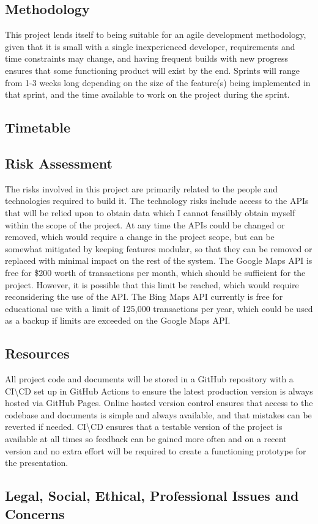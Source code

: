 \subsection{Methodology}
This project lends itself to being suitable for an agile development methodology, given that it is small with a single inexperienced developer, requirements and time constraints may change, and having frequent builds with new progress ensures that some functioning product will exist by the end. Sprints will range from 1-3 weeks long depending on the size of the feature(s) being implemented in that sprint, and the time available to work on the project during the sprint.

\subsection{Timetable}
\subsection{Risk Assessment}
The risks involved in this project are primarily related to the people and technologies required to build it.
The technology risks include access to the APIs that will be relied upon to obtain data which I cannot feasilbly obtain myself within the scope of the project.
At any time the APIs could be changed or removed, which would require a change in the project scope, but can be somewhat mitigated by keeping features modular, so that they can be removed or replaced with minimal impact on the rest of the system.
The Google Maps API is free for \$200 worth of transactions per month, which should be sufficient for the project. However, it is possible that this limit be reached, which would require reconsidering the use of the API.
The Bing Maps API currently is free for educational use with a limit of 125,000 transactions per year, which could be used as a backup if limits are exceeded on the Google Maps API.
\subsection{Resources}
All project code and documents will be stored in a GitHub repository with a CI\textbackslash CD set up in GitHub Actions to ensure the latest production version is always hosted via GitHub Pages. Online hosted version control ensures that access to the codebase and documents is simple and always available, and that mistakes can be reverted if needed. CI\textbackslash CD ensures that a testable version of the project is available at all times so feedback can be gained more often and on a recent version and no extra effort will be required to create a functioning prototype for the presentation.
\subsection{Legal, Social, Ethical, Professional Issues and Concerns}